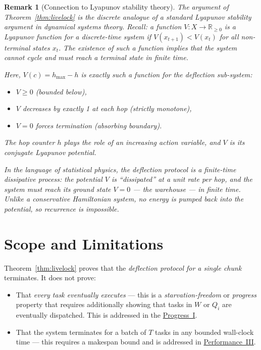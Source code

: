 \documentclass[11pt,a4paper]{article}
\newtheorem{remark}{Remark}[section]
\begin{document}
\begin{remark}[Connection to Lyapunov stability theory]
The argument of Theorem~\ref{thm:livelock} is the discrete analogue
of a standard Lyapunov stability argument in dynamical systems
theory.  Recall: a function $V : X \to \mathbb{R}_{\geq 0}$ is a
\emph{Lyapunov function} for a discrete-time system if
$V(x_{t+1}) < V(x_t)$ for all non-terminal states $x_t$.
The existence of such a function implies that the system cannot
cycle and must reach a terminal state in finite time.

Here, $V(c) = h_{\max} - h$ is exactly such a function for the
deflection sub-system:
\begin{itemize}
  \item $V \geq 0$ (bounded below),
  \item $V$ decreases by exactly 1 at each hop (strictly monotone),
  \item $V = 0$ forces termination (absorbing boundary).
\end{itemize}
The hop counter $h$ plays the role of an increasing \emph{action
variable}, and $V$ is its conjugate \emph{Lyapunov potential}.

In the language of statistical physics, the deflection protocol is
a \emph{finite-time dissipative process}: the potential $V$ is
``dissipated'' at a unit rate per hop, and the system must reach its
ground state $V=0$ --- the warehouse --- in finite time.  Unlike a
conservative Hamiltonian system, no energy is pumped back into the
potential, so recurrence is impossible.
\end{remark}

\section{Scope and Limitations}

Theorem~\ref{thm:livelock} proves that the \emph{deflection protocol
for a single chunk} terminates.  It does not prove:

\begin{itemize}
  \item That \emph{every task eventually executes} --- this is a
        \emph{starvation-freedom} or \emph{progress} property that
        requires additionally showing that tasks in $W$ or $Q_i$
        are eventually dispatched.  This is addressed in the
        \hyperref[chap:bounded_wait]{Progress~I}.
  \item That the system terminates for a batch of $T$ tasks in any
        bounded wall-clock time --- this requires a makespan bound and
        is addressed in \hyperref[chap:makespan]{Performance~III}.
\end{itemize}
\end{document}
